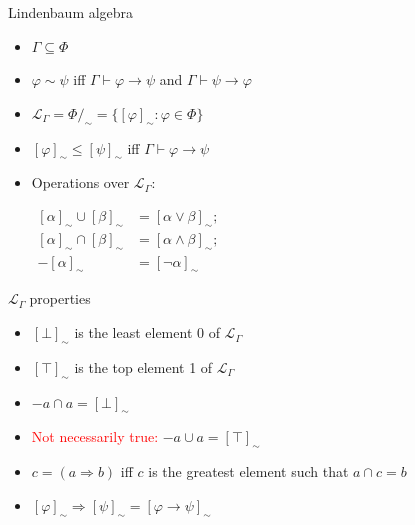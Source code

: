 \documentclass[sans]{beamer}
\begin{document}
\newcommand{\eqc}[1]{[#1]_{\sim}}
\newcommand{\mlg}{\mathcal{L}_{\Gamma}\;}
\newcommand{\mlgm}{$\mlg$}

\begin{frame}{Lindenbaum algebra}
  \begin{itemize}
    \item $\Gamma \subseteq \Phi$
    \pause
    \item $\varphi \sim \psi$ iff $\Gamma \vdash \varphi \to \psi$ and $\Gamma \vdash \psi \to \varphi$
    \pause
    \item $\mathcal{L} _{\Gamma} = {\Phi}/_{\sim} = \{\eqc{\varphi} : \varphi \in \Phi\}$
    \pause
    \item $\eqc{\varphi} \leq \eqc{\psi}$ iff $\Gamma \vdash \varphi \to \psi$
    \pause
    \item Operations over $\mathcal{L}_{\Gamma}$:

      $\begin{aligned}
        \eqc{\alpha} \cup \eqc{\beta} &= \eqc{\alpha \vee \beta}; \\
        \eqc{\alpha} \cap \eqc{\beta} &= \eqc{\alpha \wedge \beta}; \\
                     -\eqc{\alpha} &= \eqc{\lnot \alpha}
       \end{aligned}$
  \end{itemize}
\end{frame}

\begin{frame}{\mlgm properties}
  \begin{itemize}
    \item $\eqc{\bot}$ is the least element 0 of \mlgm
    \item $\eqc{\top}$ is the top element 1 of \mlgm
    
    \vfill
    \item $-a \cap a = \eqc{\bot}$
    \item \textcolor{red}{Not necessarily true:} $-a \cup a = \eqc{\top}$
    \vfill

    \item $c = (a \Rightarrow b)$ iff $c$ is the greatest element such that $a \cap c = b$
    \item $\eqc{\varphi} \Rightarrow \eqc{\psi} = \eqc{\varphi \to \psi}$

  \end{itemize}
\end{frame}
\end{document}
